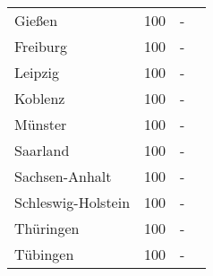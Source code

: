 \begin{table}[H]
\begin{tabularx}{\textwidth}{Xccc}
            Gießen & 100 & - \\
            Freiburg & 100 & - \\
            Leipzig & 100 & - \\
            Koblenz & 100 & - \\
            Münster & 100 & - \\
            Saarland & 100 & - \\
            Sachsen-Anhalt & 100 & - \\
            Schleswig-Holstein & 100 & - \\
            Thüringen & 100 & - \\
            Tübingen & 100 & - \\
        \bottomrule
    \end{tabularx}
\end{table}
        